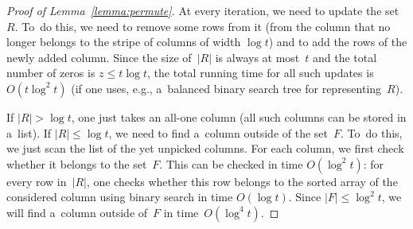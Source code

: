 \begin{proof}[Proof of Lemma~\ref{lemma:permute}]
At every iteration, we need to update the set~$R$. To~do this, we need to remove
some rows from it (from the column that no longer belongs to the stripe of
columns of width $\log t$) and to add the rows of the newly added column. Since
the size of~$|R|$ is always at most~$t$ and the total number of zeros is
$z \le t\log t$, the total running time for all such updates is
$O(t\log^2t)$ (if one uses, e.g., a~balanced binary search tree for
representing~$R$).

If $|R| > \log t$, one just takes an all-one column (all such columns
can be stored in a~list). If $|R| \le \log t$, we need to find a~column outside
of the set~$F$. To~do this, we just scan the list of the yet unpicked columns. For
each column, we first check whether it belongs to the set~$F$. This can be
checked in time $O(\log^2t)$: for every row in~$|R|$, one checks whether this
row belongs to the sorted array of the considered column using binary search in
time $O(\log t)$. Since $|F| \le \log^2t$, we will find a~column outside of~$F$
in time~$O(\log^4 t)$.

\end{proof}
